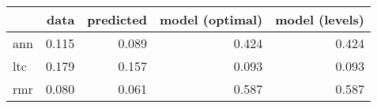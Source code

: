 \begin{tabular}{lrrrr}
\toprule
{} &   data &  predicted &  model (optimal) &  model (levels) \\
\midrule
ann &  0.115 &      0.089 &            0.424 &           0.424 \\
ltc &  0.179 &      0.157 &            0.093 &           0.093 \\
rmr &  0.080 &      0.061 &            0.587 &           0.587 \\
\bottomrule
\end{tabular}
